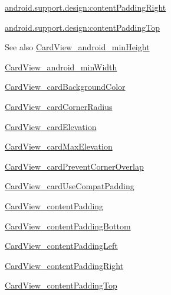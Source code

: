 {\ttfamily \hyperlink{classandroid_1_1support_1_1design_1_1R_1_1styleable_a07e43115d158fc9a8769282e868714ff}{android.\+support.\+design\+:content\+Padding\+Right}}

{\ttfamily \hyperlink{classandroid_1_1support_1_1design_1_1R_1_1styleable_a3f11c2bc91d13fa21d30841b88ee4b02}{android.\+support.\+design\+:content\+Padding\+Top}}

\begin{DoxySeeAlso}{See also}
\hyperlink{classandroid_1_1support_1_1design_1_1R_1_1styleable_aaa46b03e98d9719634ae097f8034a87a}{Card\+View\+\_\+android\+\_\+min\+Height} 

\hyperlink{classandroid_1_1support_1_1design_1_1R_1_1styleable_a7cd46aef2821766fc2a2f791147bfa8b}{Card\+View\+\_\+android\+\_\+min\+Width} 

\hyperlink{classandroid_1_1support_1_1design_1_1R_1_1styleable_a981ca74979c85ed8524c9ac8a8be63a6}{Card\+View\+\_\+card\+Background\+Color} 

\hyperlink{classandroid_1_1support_1_1design_1_1R_1_1styleable_a56013ce0ae69336c7d1e0f3c38902e3f}{Card\+View\+\_\+card\+Corner\+Radius} 

\hyperlink{classandroid_1_1support_1_1design_1_1R_1_1styleable_ab1f403337584c00422841622610e14b3}{Card\+View\+\_\+card\+Elevation} 

\hyperlink{classandroid_1_1support_1_1design_1_1R_1_1styleable_ab9004c87f60e622b9d923cc5c6a6a276}{Card\+View\+\_\+card\+Max\+Elevation} 

\hyperlink{classandroid_1_1support_1_1design_1_1R_1_1styleable_af6467363197508f4dffe4ce79959a4e7}{Card\+View\+\_\+card\+Prevent\+Corner\+Overlap} 

\hyperlink{classandroid_1_1support_1_1design_1_1R_1_1styleable_a6d33db49497d7e18a8bf8487f8d988b5}{Card\+View\+\_\+card\+Use\+Compat\+Padding} 

\hyperlink{classandroid_1_1support_1_1design_1_1R_1_1styleable_a71511b509dca70524cb9582021ad44a8}{Card\+View\+\_\+content\+Padding} 

\hyperlink{classandroid_1_1support_1_1design_1_1R_1_1styleable_aa50ab159eaffa56c7c1179a4bda584fd}{Card\+View\+\_\+content\+Padding\+Bottom} 

\hyperlink{classandroid_1_1support_1_1design_1_1R_1_1styleable_a63ea966e86e38f24ab2c64f89934a768}{Card\+View\+\_\+content\+Padding\+Left} 

\hyperlink{classandroid_1_1support_1_1design_1_1R_1_1styleable_a07e43115d158fc9a8769282e868714ff}{Card\+View\+\_\+content\+Padding\+Right} 

\hyperlink{classandroid_1_1support_1_1design_1_1R_1_1styleable_a3f11c2bc91d13fa21d30841b88ee4b02}{Card\+View\+\_\+content\+Padding\+Top} 
\end{DoxySeeAlso}
